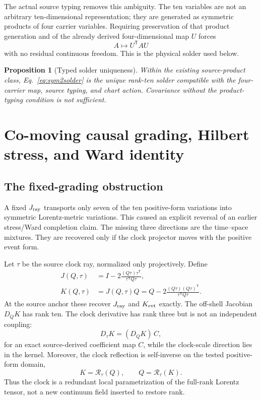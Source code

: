 \documentclass[11pt]{article}
\newtheorem{proposition}[theorem]{Proposition}
\theoremstyle{definition}
\theoremstyle{remark}
\begin{document}
The actual source typing removes this ambiguity. The ten variables are not an arbitrary ten-dimensional representation; they are generated as symmetric products of four carrier variables. Requiring preservation of that product generation and of the already derived four-dimensional map $U$ forces
\begin{equation}\label{eq:sym2solder}
 A\longmapsto U^{\mathsf T}AU
\end{equation}
with no residual continuous freedom. This is the physical solder used below.

\begin{proposition}[Typed solder uniqueness]\label{prop:solder}
Within the existing source-product class, Eq.~\eqref{eq:sym2solder} is the unique rank-ten solder compatible with the four-carrier map, source typing, and chart action. Covariance without the product-typing condition is not sufficient.
\end{proposition}

\section{Co-moving causal grading, Hilbert stress, and Ward identity}

\subsection{The fixed-grading obstruction}

A fixed $J_{\rm ray}$ transports only seven of the ten positive-form variations into symmetric Lorentz-metric variations. This caused an explicit reversal of an earlier stress/Ward completion claim. The missing three directions are the time--space mixtures. They are recovered only if the clock projector moves with the positive event form.

Let $\tau$ be the source clock ray, normalized only projectively. Define
\begin{align}
 J(Q,\tau)&=I-2\frac{(Q\tau)\tau^{\mathsf T}}{\tau^{\mathsf T}Q\tau},\label{eq:comovingJ}\\
 K(Q,\tau)&=J(Q,\tau)Q
 =Q-2\frac{(Q\tau)(Q\tau)^{\mathsf T}}{\tau^{\mathsf T}Q\tau}.
 \label{eq:comovingK}
\end{align}
At the source anchor these recover $J_{\rm ray}$ and $K_{\rm evt}$ exactly. The off-shell Jacobian $D_QK$ has rank ten. The clock derivative has rank three but is not an independent coupling:
\begin{equation}\label{eq:clockredundancy}
 D_{\tau}K=(D_QK)\,C,
\end{equation}
for an exact source-derived coefficient map $C$, while the clock-scale direction lies in the kernel. Moreover, the clock reflection is self-inverse on the tested positive-form domain,
\begin{equation}
 K=\mathcal R_{\tau}(Q),
 \qquad Q=\mathcal R_{\tau}(K).
\end{equation}
Thus the clock is a redundant local parametrization of the full-rank Lorentz tensor, not a new continuum field inserted to restore rank.
\end{document}
